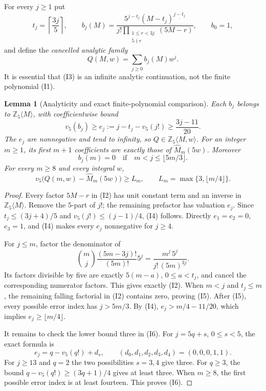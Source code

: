 \documentclass[11pt]{article}
\newtheorem{lemma}{Lemma}
\newcommand{\ZZ}{\mathbb Z}
\newcommand{\ff}[2]{#1^{\underline{#2}}}
\begin{document}
For every $j\ge1$ put
\[
 t_j=\left\lceil\frac{3j}{5}\right\rceil,\qquad
 b_j(M)=
 \frac{5^{j-t_j}\ff{(M-t_j)}{j-t_j}}
 {j!\displaystyle\prod_{\substack{1\le r<3j\\5\nmid r}}(5M-r)},
 \qquad b_0=1,                                                     \tag{I2}
\]
and define the \emph{cancelled analytic family}
\[
                  Q(M,w)=\sum_{j\ge0}b_j(M)w^j.                    \tag{I3}
\]
It is essential that (I3) is an infinite analytic continuation, not
the finite polynomial (I1).

\begin{lemma}[Analyticity and exact finite-polynomial comparison]\label{lem:quintic-cancelled-tate}
Each $b_j$ belongs to $\ZZ_5\langle M\rangle$, with coefficientwise bound
\[
 v_5(b_j)\ge e_j:=j-t_j-v_5(j!)\ge\frac{3j-11}{20}.                 \tag{I4}
\]
The $e_j$ are nonnegative and tend to infinity, so
$Q\in\ZZ_5\langle M,w\rangle$.
For an integer $m\ge1$, its first $m+1$ coefficients are exactly those
of $\widehat M_m(5w)$.  Moreover
\[
 b_j(m)=0\quad\text{if}\quad m<j\le\lfloor5m/3\rfloor.              \tag{I5}
\]
For every $m\ge8$ and every integral $w$,
\[
 v_5\bigl(Q(m,w)-\widehat M_m(5w)\bigr)\ge L_m,\qquad
 L_m=\max\{3,\lfloor m/4\rfloor\}.                                \tag{I6}
\]
\end{lemma}
\begin{proof}
Every factor $5M-r$ in (I2) has unit constant term and an inverse
in $\ZZ_5\langle M\rangle$.  Remove the $5$-part of $j!$;
the remaining prefactor has valuation $e_j$.
Since $t_j\le(3j+4)/5$ and
$v_5(j!)\le(j-1)/4$, (I4) follows.
Directly $e_1=e_2=0$, $e_3=1$, and (I4) makes every $e_j$
nonnegative for $j\ge4$.

For $j\le m$, factor the denominator of
\[
 \binom mj\frac{(5m-3j)!}{(5m)!}5^j
       =\frac{\ff m j\,5^j}{j!\,\ff{(5m)}{3j}} .
\]
Its factors divisible by five are exactly $5(m-a)$,
$0\le a<t_j$, and cancel the corresponding numerator factors.
This gives exactly (I2).  When $m<j$ and $t_j\le m$,
the remaining falling factorial in (I2) contains zero, proving (I5).
After (I5), every possible error index has $j>5m/3$.
By (I4), $e_j>m/4-11/20$, which implies
$e_j\ge\lfloor m/4\rfloor$.

It remains to check the lower bound three in (I6).
For $j=5q+s$, $0\le s<5$, the exact formula is
\[
 e_j=q-v_5(q!)+d_s,\qquad (d_0,d_1,d_2,d_3,d_4)=(0,0,0,1,1).
\]
For $j\ge13$ and $q=2$ the two possibilities $s=3,4$ give three.
For $q\ge3$, the bound
$q-v_5(q!)\ge(3q+1)/4$ gives at least three.
When $m\ge8$, the first possible error index is at least fourteen.
This proves (I6).
\end{proof}
\end{document}
